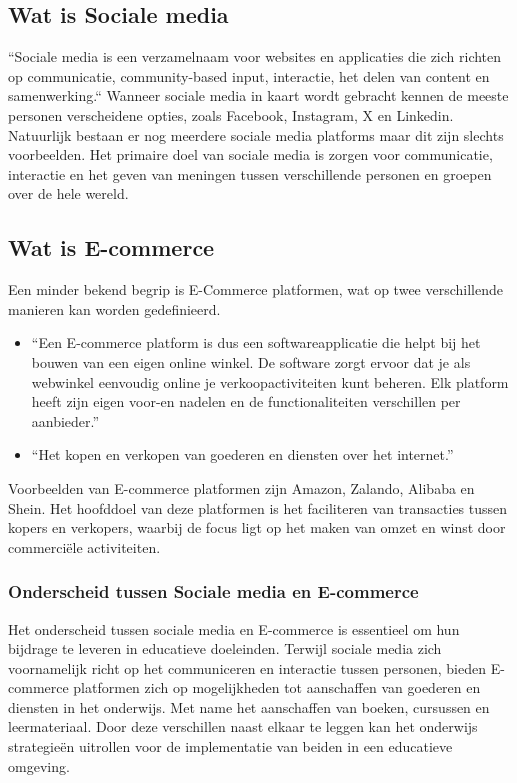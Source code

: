 \subsection{Wat is Sociale media}
``Sociale media is een verzamelnaam voor websites en applicaties die zich richten op communicatie, community-based input, interactie, het delen van content en samenwerking.`` \autocite{Lutkevich_Wigmore_2021}
Wanneer sociale media in kaart wordt gebracht kennen de meeste personen verscheidene opties, zoals Facebook, Instagram, X en Linkedin. Natuurlijk bestaan er nog meerdere sociale media platforms maar dit zijn slechts voorbeelden. Het primaire doel van sociale media is zorgen voor communicatie, interactie en het geven van meningen tussen verschillende personen en groepen over de hele wereld. \newline

\subsection{Wat is E-commerce}
Een minder bekend begrip is E-Commerce platformen, wat op twee verschillende manieren kan worden gedefinieerd. 
\begin{itemize}
    \item  ``Een E-commerce platform is dus een softwareapplicatie die helpt bij het bouwen van een eigen online winkel. De software zorgt ervoor dat je als webwinkel eenvoudig online je verkoopactiviteiten kunt beheren. Elk platform heeft zijn eigen voor-en nadelen en de functionaliteiten verschillen per aanbieder.''\autocite{Elbertse_2021} 
    \item ``Het kopen en verkopen van goederen en diensten over het internet.''\autocite{e-commerce2024}
\end{itemize}
Voorbeelden van E-commerce platformen zijn Amazon, Zalando, Alibaba en Shein. Het hoofddoel van deze platformen is het faciliteren van transacties tussen kopers en verkopers, waarbij de focus ligt op het maken van omzet en winst door commerciële activiteiten. \newline

\subsubsection{Onderscheid tussen Sociale media en E-commerce}
Het onderscheid tussen sociale media en E-commerce is essentieel om hun bijdrage te leveren in educatieve doeleinden. Terwijl sociale media zich voornamelijk richt op het communiceren en interactie tussen personen, bieden E-commerce platformen zich op mogelijkheden tot aanschaffen van goederen en diensten in het onderwijs. Met name het aanschaffen van boeken, cursussen en leermateriaal. Door deze verschillen naast elkaar te leggen kan het onderwijs strategieën uitrollen voor de implementatie van beiden in een educatieve omgeving.\newline
